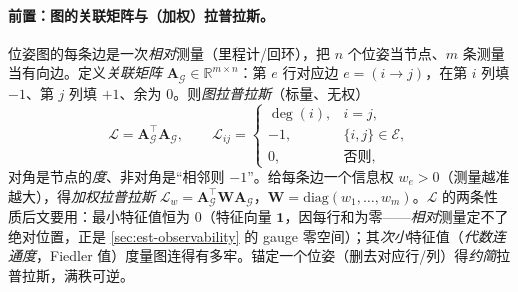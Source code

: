 \paragraph{前置：图的关联矩阵与（加权）拉普拉斯。}
位姿图的每条边是一次\emph{相对}测量（里程计/回环），把 $n$ 个位姿当节点、$m$ 条测量当有向边。定义\emph{关联矩阵} $\mathbf{A}_{\mathcal{G}}\in\mathbb{R}^{m\times n}$：第 $e$ 行对应边 $e=(i\to j)$，在第 $i$ 列填 $-1$、第 $j$ 列填 $+1$、余为 $0$。则\emph{图拉普拉斯}（标量、无权）
\begin{equation}
  \boldsymbol{\mathcal{L}}=\mathbf{A}_{\mathcal{G}}^\top\mathbf{A}_{\mathcal{G}},\qquad
  \boldsymbol{\mathcal{L}}_{ij}=\begin{cases}\deg(i),&i=j,\\ -1,&\{i,j\}\in\mathcal{E},\\ 0,&\text{否则},\end{cases}
  \label{eq:fim-laplacian-def}
\end{equation}
对角是节点的\emph{度}、非对角是“相邻则 $-1$”。给每条边一个信息权 $w_e>0$（测量越准越大），得\emph{加权拉普拉斯} $\boldsymbol{\mathcal{L}}_w=\mathbf{A}_{\mathcal{G}}^\top\mathbf{W}\mathbf{A}_{\mathcal{G}}$，$\mathbf{W}=\mathrm{diag}(w_1,\dots,w_m)$。$\boldsymbol{\mathcal{L}}$ 的两条性质后文要用：最小特征值恒为 $0$（特征向量 $\mathbf{1}$，因每行和为零——\emph{相对}测量定不了绝对位置，正是 \cref{sec:est-observability} 的 gauge 零空间）；其\emph{次小}特征值（\emph{代数连通度}，Fiedler 值）度量图连得有多牢。锚定一个位姿（删去对应行/列）得\emph{约简}拉普拉斯，满秩可逆。

